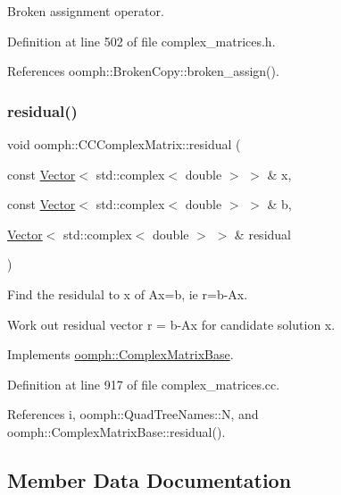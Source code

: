 Broken assignment operator. 



Definition at line 502 of file complex\+\_\+matrices.\+h.



References oomph\+::\+Broken\+Copy\+::broken\+\_\+assign().

\mbox{\label{classoomph_1_1CCComplexMatrix_ade719948640907a8f338f83ee1587a90}} 
\subsubsection{\texorpdfstring{residual()}{residual()}}
{\footnotesize\ttfamily void oomph\+::\+C\+C\+Complex\+Matrix\+::residual (\begin{DoxyParamCaption}\item[{const \hyperlink{classoomph_1_1Vector}{Vector}$<$ std\+::complex$<$ double $>$ $>$ \&}]{x,  }\item[{const \hyperlink{classoomph_1_1Vector}{Vector}$<$ std\+::complex$<$ double $>$ $>$ \&}]{b,  }\item[{\hyperlink{classoomph_1_1Vector}{Vector}$<$ std\+::complex$<$ double $>$ $>$ \&}]{residual }\end{DoxyParamCaption})\hspace{0.3cm}{\ttfamily [virtual]}}



Find the residulal to x of Ax=b, ie r=b-\/\+Ax. 

Work out residual vector r = b-\/\+Ax for candidate solution x. 

Implements \hyperlink{classoomph_1_1ComplexMatrixBase_aec72875402b9ba387e0724d6c2597430}{oomph\+::\+Complex\+Matrix\+Base}.



Definition at line 917 of file complex\+\_\+matrices.\+cc.



References i, oomph\+::\+Quad\+Tree\+Names\+::N, and oomph\+::\+Complex\+Matrix\+Base\+::residual().



\subsection{Member Data Documentation}
\mbox{\label{classoomph_1_1CCComplexMatrix_a8b3cb444d689a80fc8eab064bde4a7fb}} 
